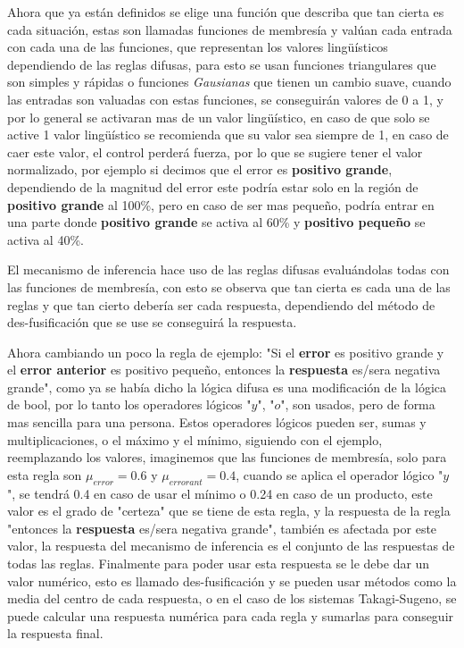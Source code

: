 Ahora que ya están definidos se elige una función que describa que tan cierta es cada situación, estas son llamadas funciones de membresía y valúan cada entrada con cada una de las funciones, que representan los valores lingüísticos dependiendo de las reglas difusas, para esto se usan funciones triangulares que son simples y rápidas o funciones \textit{Gausianas} que tienen un cambio suave, cuando las entradas son valuadas con estas funciones, se conseguirán valores de 0 a 1, y por lo general se activaran mas de un valor lingüístico, en caso de que solo se active 1 valor lingüístico se recomienda que su valor sea siempre de 1, en caso de caer este valor, el control perderá fuerza, por lo que se sugiere tener el valor normalizado, por ejemplo si decimos que el error es \textbf{positivo grande}, dependiendo de la magnitud del error este podría estar solo en la región de \textbf{positivo grande} al 100\%, pero en caso de ser mas pequeño, podría entrar en una parte donde \textbf{positivo grande} se activa al 60\% y \textbf{positivo pequeño} se activa al 40\%.

El mecanismo de inferencia hace uso de las reglas difusas evaluándolas todas con las funciones de membresía, con esto se observa que tan cierta es cada una de las reglas y que tan cierto debería ser cada respuesta, dependiendo del método de des-fusificación que se use se conseguirá la respuesta.

Ahora cambiando un poco la regla de ejemplo: "Si el \textbf{error} es positivo grande y el \textbf{error anterior} es positivo pequeño, entonces la \textbf{respuesta} es/sera negativa grande", como ya se había dicho la lógica difusa es una modificación de la lógica de bool, por lo tanto los operadores lógicos "$y$", "$o$", son usados, pero de forma mas sencilla para una persona. Estos operadores lógicos pueden ser, sumas y multiplicaciones, o el máximo y el mínimo, siguiendo con el ejemplo, reemplazando los valores, imaginemos que las funciones de membresía, solo para esta regla son $\mu_{error}=0.6$ y $\mu_{errorant}=0.4$, cuando se aplica el operador lógico "$y$", se tendrá 0.4 en caso de usar el mínimo o 0.24 en caso de un producto, este valor es el grado de "certeza" que se tiene de esta regla, y la respuesta de la regla "entonces la \textbf{respuesta} es/sera negativa grande", también es afectada por este valor, la respuesta del mecanismo de inferencia es el conjunto de las  respuestas de todas las reglas.
Finalmente para poder usar esta respuesta se le debe dar un valor numérico, esto es llamado des-fusificación y se pueden usar métodos como la media del centro de cada respuesta, o en el caso de los sistemas Takagi-Sugeno, se puede calcular una respuesta numérica para cada regla y sumarlas para conseguir la respuesta final.


